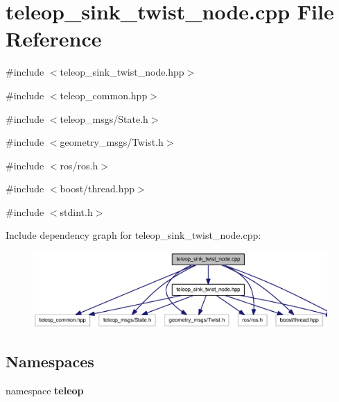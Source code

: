 \section{teleop\_\-sink\_\-twist\_\-node.cpp File Reference}
\label{teleop__sink__twist__node_8cpp}
{\ttfamily \#include $<$teleop\_\-sink\_\-twist\_\-node.hpp$>$}\par
{\ttfamily \#include $<$teleop\_\-common.hpp$>$}\par
{\ttfamily \#include $<$teleop\_\-msgs/State.h$>$}\par
{\ttfamily \#include $<$geometry\_\-msgs/Twist.h$>$}\par
{\ttfamily \#include $<$ros/ros.h$>$}\par
{\ttfamily \#include $<$boost/thread.hpp$>$}\par
{\ttfamily \#include $<$stdint.h$>$}\par
Include dependency graph for teleop\_\-sink\_\-twist\_\-node.cpp:
\nopagebreak
\begin{figure}[H]
\begin{center}
\leavevmode
\includegraphics[width=400pt]{teleop__sink__twist__node_8cpp__incl}
\end{center}
\end{figure}
\subsection*{Namespaces}
\begin{DoxyCompactItemize}
\item 
namespace {\bf teleop}
\end{DoxyCompactItemize}
